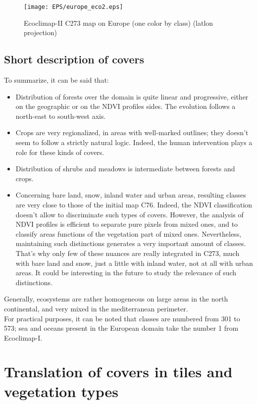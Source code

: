 \begin{figure}
\begin{center}
\texttt{[image: EPS/europe\_eco2.eps]}
\caption{\label{figure2} Ecoclimap-II C273 map on Europe (one color by class) (latlon projection)} 
\end{center}
\end{figure}

\subsection{Short description of covers}

To summarize, it can be said that:
\begin{itemize}
\item{Distribution of forests over the domain is quite linear and progressive, either on the geographic or on the NDVI profiles sides. The evolution 
follows a north-east to south-west axis.}
\item{Crops are very regionalized, in areas with well-marked outlines; they doesn't seem to follow a strictly natural logic. Indeed, 
the human intervention plays a role for these kinds of covers.}
\item{Distribution of shrubs and meadows is intermediate between forests and crops.}
\item{Concerning bare land, snow, inland water and urban areas, resulting classes are very close to those of the initial map C76. Indeed, the NDVI 
classification doesn't allow to discriminate such types of covers. However, the analysis of NDVI profiles is efficient to separate pure 
pixels from mixed ones, and to classify areas functions of the vegetation part of mixed ones. Nevertheless, maintaining such distinctions 
generates a very important amount of classes. That's why only few of these nuances are really integrated in C273, much with bare land and 
snow, just a little with inland water, not at all with urban areas. It could be interesting in the future to study the relevance of such 
distinctions.}
\end{itemize}
Generally, ecosystems are rather homogeneous on large areas in the north continental, and very mixed in the mediterranean perimeter. \\

For practical purposes, it can be noted that classes are numbered from 301 to 573; sea and oceans present in the European domain 
take the number 1 from Ecoclimap-I. 

\section{Translation of covers in tiles and vegetation types}

